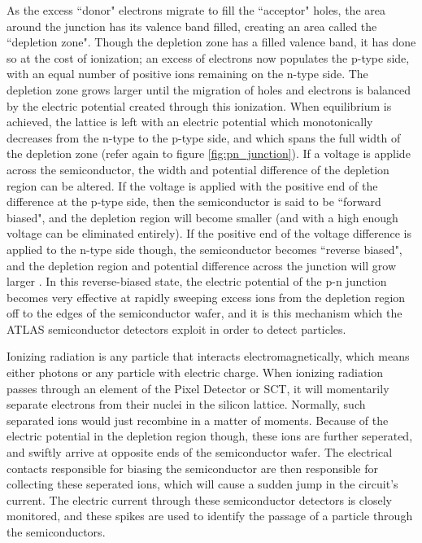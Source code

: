         As the excess ``donor" electrons migrate to fill the ``acceptor" holes, the area around the junction has its valence band filled, creating an area called the ``depletion zone".
        Though the depletion zone has a filled valence band, it has done so at the cost of ionization; an excess of electrons now populates the p-type side, with an equal number of positive ions remaining on the n-type side.
        The depletion zone grows larger until the migration of holes and electrons is balanced by the electric potential created through this ionization.
        When equilibrium is achieved, the lattice is left with an electric potential which monotonically decreases from the n-type to the p-type side, and which spans the full width of the depletion zone (refer again to figure \ref{fig:pn_junction}).
        If a voltage is applide across the semiconductor, the width and potential difference of the depletion region can be altered.
        If the voltage is applied with the positive end of the difference at the p-type side, then the semiconductor is said to be ``forward biased", and the depletion region will become smaller (and with a high enough voltage can be eliminated entirely).
        If the positive end of the voltage difference is applied to the n-type side though, the semiconductor becomes ``reverse biased", and the depletion region and potential difference across the junction will grow larger \cite{wiley_radiation_detection}.
        In this reverse-biased state, the electric potential of the p-n junction becomes very effective at rapidly sweeping excess ions from the depletion region off to the edges of the semiconductor wafer, and it is this mechanism which the ATLAS semiconductor detectors exploit in order to detect particles.

        Ionizing radiation is any particle that interacts electromagnetically, which means either photons or any particle with electric charge.
        When ionizing radiation passes through an element of the Pixel Detector or SCT, it will momentarily separate electrons from their nuclei in the silicon lattice.
        Normally, such separated ions would just recombine in a matter of moments.
        Because of the electric potential in the depletion region though, these ions are further seperated, and swiftly arrive at opposite ends of the semiconductor wafer.
        The electrical contacts responsible for biasing the semiconductor are then responsible for collecting these seperated ions, which will cause a sudden jump in the circuit's current.
        The electric current through these semiconductor detectors is closely monitored, and these spikes are used to identify the passage of a particle through the semiconductors.

